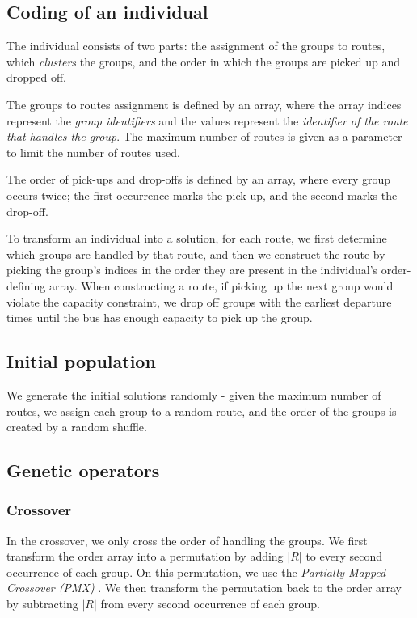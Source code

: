 \subsection{Coding of an individual}

The individual consists of two parts: the assignment of the groups to routes, which \textit{clusters} the groups, and the order in which the groups are picked up and dropped off.

The groups to routes assignment is defined by an array, where the array indices represent the \textit{group identifiers} and the values represent the \textit{identifier of the route that handles the group}. The maximum number of routes is given as a parameter to limit the number of routes used.

The order of pick-ups and drop-offs is defined by an array, where every group occurs twice; the first occurrence marks the pick-up, and the second marks the drop-off.

To transform an individual into a solution, for each route, we first determine which groups are handled by that route, and then we construct the route by picking the group's indices in the order they are present in the individual's order-defining array. When constructing a route, if picking up the next group would violate the capacity constraint, we drop off groups with the earliest departure times until the bus has enough capacity to pick up the group.

\subsection{Initial population}

We generate the initial solutions randomly - given the maximum number of routes, we assign each group to a random route, and the order of the groups is created by a random shuffle.

\subsection{Genetic operators}

\subsubsection{Crossover}

In the crossover, we only cross the order of handling the groups. We first transform the order array into a permutation by adding $|R|$ to every second occurrence of each group. On this permutation, we use the \textit{Partially Mapped Crossover (PMX)} \cite{Goldberg1985AllelesLA}. We then transform the permutation back to the order array by subtracting $|R|$ from every second occurrence of each group.

